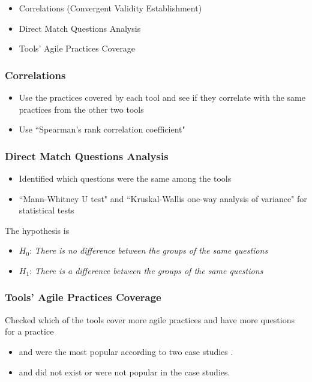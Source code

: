 \clearpage

\begin{itemize}
	\item Correlations ({\footnotesize Convergent Validity Establishment})
	\item Direct Match Questions Analysis
	\item Tools' Agile Practices Coverage
\end{itemize}

\clearpage

\subsubsection{Correlations}

\begin{itemize}
	\item Use the practices covered by each tool and see if they correlate with the same practices from the other two tools
	\item Use ``Spearman's rank correlation coefficient"
\end{itemize}

\clearpage

\subsubsection{Direct Match Questions Analysis}

\begin{itemize}
	\item Identified which questions were the same among the tools
	\item ``Mann-Whitney U test" and ``Kruskal-Wallis one-way analysis of variance" for statistical tests
\end{itemize}

The hypothesis is

\begin{itemize}[label={}]
	\item $H_0$: \textit{There is no difference between the groups of the same questions}
	\item $H_1$: \textit{There is a difference between the groups of the same questions}
\end{itemize}

\clearpage

\subsubsection{Tools' Agile Practices Coverage}

Checked which of the tools cover more agile practices and have more questions for a practice

\begin{itemize}
	\item and were the most popular according to two case studies \cite{Williams_Microsoft, laurie_williams}.
	\item and did not exist or were not popular in the case studies.
\end{itemize}

\clearpage

